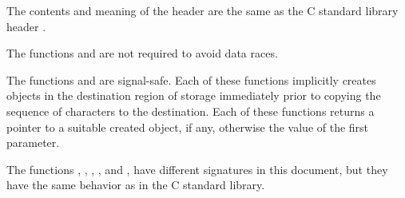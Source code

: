 \pnum
The contents and meaning of the header 
are the same as the C standard library header .

\pnum
The functions  and  are not required to avoid data
races.

\pnum
{}%
%
The functions  and  are signal-safe.
Each of these functions implicitly creates objects
in the destination region of storage
immediately prior to copying the sequence of characters to the destination.
Each of these functions returns a pointer to a suitable created object, if any,
otherwise the value of the first parameter.

\pnum
\begin{note}
The functions
, , , , and ,
have different signatures in this document,
but they have the same behavior as in the C standard library.
\end{note}

